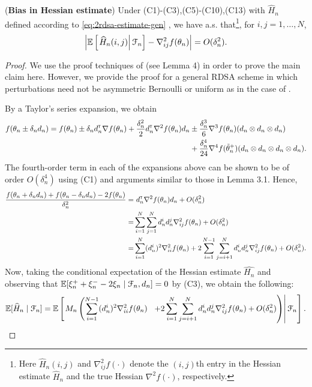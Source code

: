 \begin{lemma}(\textbf{Bias in Hessian estimate})
\label{lemma:2rdsa-gen-bias}
Under (C1)-(C3),(C5)-(C10),(C13) with $\widehat H_n$ defined according to \eqref{eq:2rdsa-estimate-gen} , we have a.s. that\footnote{Here $\widehat H_n(i,j)$ and $\nabla^2_{ij}f(\cdot)$ denote the $(i,j)$th entry in the Hessian estimate $\widehat H_n$ and the true Hessian $\nabla^2 f(\cdot)$, respectively.}, for $i,j = 1,\ldots,N$,
\begin{align}
\left|\mathbb{E}\left[
\left. \widehat H_n(i,j) \right| \mathcal{F}_n \right] - \nabla^2_{ij} f(\theta_n)\right| = O(\delta_n^2).
\end{align} 
\end{lemma}
\begin{proof}
We use the proof techniques of \cite{prashanth2015rdsa} (see Lemma 4) in order to prove the main claim here. However, we provide the proof for a general RDSA scheme in which perturbations need not be asymmetric Bernoulli or uniform as in the case of \cite{prashanth2015rdsa}.

By a Taylor's series expansion, we obtain
\begin{align*}
f(\theta_n \pm \delta_n d_n) = f(\theta_n) \pm \delta_n d_n^\mathsf{\scriptscriptstyle T} \nabla f(\theta_n) + \frac{\delta_n^2}{2} d_n^\mathsf{\scriptscriptstyle T} \nabla^2 f(\theta_n) d_n &\pm \frac{\delta_n^3}{6} \nabla^3 f(\theta_n) (d_n \otimes d_n \otimes d_n) \\
 & +  \frac{\delta_n^4}{24} \nabla^4 f(\tilde  \theta_n^+)(d_n \otimes d_n \otimes d_n \otimes d_n).
\end{align*}
The fourth-order term in each of the expansions above can be shown to be of order $O(\delta_n^4)$ using (C1) and arguments similar to those in Lemma 3.1. Hence,
\begin{align*}
\dfrac{f(\theta_n+\delta_n d_n) + f(\theta_n-\delta_n d_n) - 2 f(\theta_n)}{\delta_n^2}
 = &\,\, d_n^\mathsf{\scriptscriptstyle T} \nabla^2 f(\theta_n) d_n +  O(\delta_n^2)\\
= & \sum\limits_{i=1}^N\sum\limits_{j=1}^N d_n^i d_n^j \nabla^2_{ij} f(\theta_n) + O(\delta_n^2)\\
= & \sum\limits_{i=1}^N (d_n^i)^2 \nabla^2_{ii} f(\theta_n) + 2\sum\limits_{i=1}^{N-1}\sum\limits_{j=i+1}^N d_n^i d_n^j \nabla^2_{ij} f(\theta_n) + O(\delta_n^2).
\end{align*}
Now, taking the conditional expectation of the Hessian estimate $\widehat{H_n}$ and observing that $\mathbb{E}[\xi_n^+ + \xi_n^- - 2\xi_n \mid \mathcal{F}_n, d_n] = 0$ by (C3), we obtain the following:
\begin{align}
\mathbb{E}[\widehat H_n \mid \mathcal{F}_n] =  \mathbb{E}\left[\left. M_n \left(\sum\limits_{i=1}^{N-1} (d_n^i)^2 \nabla^2_{ii} f(\theta_n) \right.\right.\right.\left.\left.\left.+ 2\sum\limits_{i=1}^N\sum\limits_{j=i+1}^N d_n^i d_n^j \nabla^2_{ij} f(\theta_n) + O(\delta_n^2)\right)\right| \mathcal{F}_n\right]. \label{eq:h1}
\end{align}


\end{proof}
